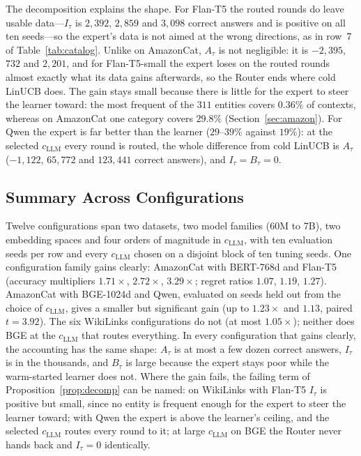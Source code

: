 \documentclass[anon]{alt2027} %
\begin{document}
The decomposition explains the shape. For Flan-T5 the routed rounds do leave
usable data---$I_\tau$ is $2{,}392$, $2{,}859$ and $3{,}098$ correct answers and is
positive on all ten seeds---so the expert's data is not aimed at the wrong
directions, as in row~7 of Table~\ref{tab:catalog}. Unlike on AmazonCat,
$A_\tau$ is not negligible: it is $-2{,}395$, $732$ and $2{,}201$, and for
Flan-T5-small the expert loses on the routed rounds almost exactly what its
data gains afterwards, so the Router ends where cold LinUCB does. The gain stays small
because there is little for the expert to steer the learner toward: the most
frequent of the $311$ entities covers $0.36\%$ of contexts, whereas on
AmazonCat one category covers $29.8\%$ (Section~\ref{sec:amazon}). For Qwen the expert is far better than the
learner ($29$--$39\%$ against $19\%$): at the selected $c_{\mathrm{LLM}}$ every round
is routed, the whole difference from cold LinUCB is $A_\tau$ ($-1{,}122$,
$65{,}772$ and $123{,}441$ correct answers), and $I_\tau=B_\tau=0$.

\subsection{Summary Across Configurations}
\label{app:summary}

Twelve configurations span two datasets, two model families (60M to 7B), two
embedding spaces and four orders of magnitude in $c_{\mathrm{LLM}}$, with ten evaluation
seeds per row and every $c_{\mathrm{LLM}}$ chosen on a disjoint block of ten tuning seeds. One configuration family
gains clearly: AmazonCat with BERT-768d and Flan-T5 (accuracy multipliers
$1.71\times$, $2.72\times$, $3.29\times$; regret ratios $1.07$, $1.19$,
$1.27$). AmazonCat with BGE-1024d and Qwen, evaluated on seeds held out from
the choice of $c_{\mathrm{LLM}}$, gives a smaller but significant gain (up to $1.23\times$ and
$1.13$, paired $t=3.92$). The six WikiLinks configurations do not (at most
$1.05\times$); neither does BGE at the $c_{\mathrm{LLM}}$ that routes everything. In every configuration
that gains clearly, the accounting has the same shape: $A_\tau$ is at most a few
dozen correct answers, $I_\tau$ is in the thousands, and $B_\tau$ is large because the expert stays poor while the
warm-started learner does not. Where the gain fails, the failing term of
Proposition~\ref{prop:decomp} can be named: on WikiLinks with Flan-T5
$I_\tau$ is positive but small, since no entity is frequent enough for the
expert to steer the learner toward; with Qwen the expert is above the learner's
ceiling, and the selected $c_{\mathrm{LLM}}$ routes every round to it;
at large $c_{\mathrm{LLM}}$ on BGE the Router never hands back and $I_\tau=0$ identically.
\end{document}
